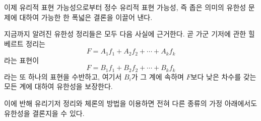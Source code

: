 
이제 유리적 표현 가능성으로부터 정수 유리적 표현 가능성, 즉 좁은 의미의 유한성 문제에 대하여 가능한 한 폭넓은 결론을 이끌어 낸다.

지금까지 알려진 유한성 정리들은 모두 다음 사실에 근거한다. 곧 가군 기저에 관한 힐베르트 정리는
\[
  F=A_1f_1+A_2f_2+\cdots+A_kf_k
\]
라는 표현이
\[
  F=B_1f_1+B_2f_2+\cdots+B_kf_k
\]
라는 또 하나의 표현을 수반하고, 여기서 $B_i$가 그 계에 속하며 $F$보다 낮은 차수를 갖는 모든 계에 대하여 유한성을 보장한다.

이에 반해 유리기저 정리와 체론의 방법을 이용하면 전혀 다른 종류의 가정 아래에서도 유한성을 결론지을 수 있다.
